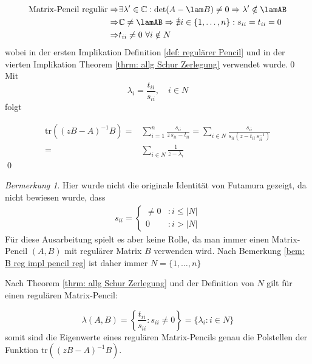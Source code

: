 \documentclass[a4paper,12pt]{report}
\newcommand{\C}{\mathbb C}
\newcommand{\tr}{\text{tr}}
\newcommand{\inv}{^{-1}}
\newcommand{\1}{\mathds{1}}
\theoremstyle{plain} %
\theoremstyle{definition} %
\theoremstyle{remark}
\newtheorem{remark}[theorem]{Bermerkung}
\begin{document}
            \begin{align*}
                  \text{Matrix-Pencil regulär} \Rightarrow& \exists \lambda'\in \C: \det(A-\lam B)\ne 0 \Rightarrow \lambda'\notin \lamAB\\
                  \Rightarrow & \C \neq \lamAB \Rightarrow \nexists i\in\{1,\dots, n\}: s_{ii}=t_{ii}=0\\
                  \Rightarrow & t_{ii}\neq 0\ \forall i\notin N
            \end{align*}
            wobei in der ersten Implikation Definition \ref{def: regulärer Pencil} und in der vierten Implikation Theorem \ref{thrm: allg Schur Zerlegung} verwendet wurde.\qed \\

            Mit
            $$\lambda_i = \frac{t_{ii}}{s_{ii}},\quad i\in N$$
            folgt

            \begin{align*}
                  \tr((zB-A)\inv B) =& \sum_{i=1}^{n}\frac{s_{ii}}{z\,s_{ii}-t_{ii}} = \sum_{i\in N}\frac{s_{ii}}{s_{ii}(z-t_{ii}\, s_{ii}\inv)}\\
                  =& \sum_{i\in N} \frac{1}{z-\lambda_i}
            \end{align*}\qed

            \begin{remark}
                  Hier wurde nicht die originale Identität von Futamura gezeigt, da nicht bewiesen wurde, dass
                  \begin{align*}
                        s_{ii} = \begin{cases}
                              \ne 0 & : i\le |N|\\
                              0 & : i>|N|
                        \end{cases}
                  \end{align*}
                  Für diese Ausarbeitung spielt es aber keine Rolle, da man immer einen Matrix-Pencil $(A, B)$ mit regulärer Matrix $B$ verwenden wird.
                  Nach Bemerkung \ref{bem: B reg impl pencil reg} ist daher immer $N=\{1,\dots, n\}$
            \end{remark}

            Nach Theorem \ref{thrm: allg Schur Zerlegung} und der Definition von $N$ gilt für einen regulären Matrix-Pencil:

            $$\lambda(A, B) = \left\{\frac{t_{ii}}{s_{ii}} : s_{ii}\ne 0\right\} = \{\lambda_i: i\in N\}$$
            somit sind die Eigenwerte eines regulären Matrix-Pencils genau die Polstellen der Funktion $\tr((zB-A)\inv B)$.
\end{document}
